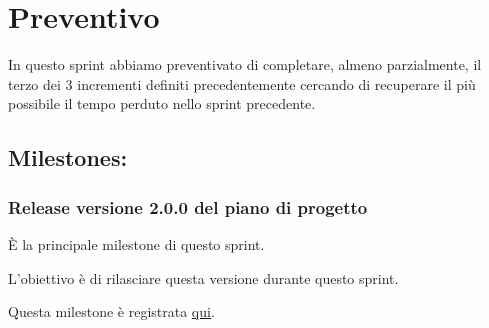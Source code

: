 \section{Preventivo}

In questo sprint abbiamo preventivato di completare, almeno parzialmente, il terzo dei 3 incrementi definiti precedentemente cercando di recuperare il più possibile il tempo perduto nello sprint precedente.

\subsection{Milestones:}  

\subsubsection{Release versione 2.0.0 del piano di progetto}

È la principale milestone di questo sprint.

L'obiettivo è di rilasciare questa versione durante questo sprint.

Questa milestone è registrata \href{https://github.com/SWEasabi/piano-di-progetto/milestone/2}{qui}.
